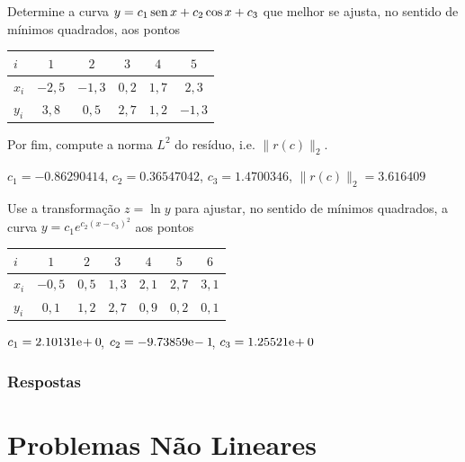 \begin{exer}
  Determine a curva $y = c_1\operatorname{sen} x + c_2\cos x + c_3$ que melhor se ajusta, no sentido de mínimos quadrados, aos pontos
  \begin{center}
    \begin{tabular}{l|ccccc}
      $i$ & $1$ & $2$ & $3$ & $4$ & $5$ \\\hline
      $x_i$ & $-2,5$ & $-1,3$ & $0,2$ & $1,7$ & $2,3$\\
      $y_i$ & $3,8$ & $0,5$ & $2,7$ & $1,2$ & $-1,3$\\\hline
    \end{tabular}
  \end{center}
Por fim, compute a norma $L^2$ do resíduo, i.e. $\|r(c)\|_2$.
\end{exer}
\begin{resp}
  $c_1 = -0.86290414$, $c_2 = 0.36547042$, $c_3 = 1.4700346$, $\|r(c)\|_2 = 3.616409$
\end{resp}

\begin{exer}
  Use a transformação $z = \ln y$ para ajustar, no sentido de mínimos quadrados, a curva $y = c_1e^{c_2(x-c_3)^2}$ aos pontos
  \begin{center}
    \begin{tabular}{l|cccccc}
      $i$ & $1$ & $2$ & $3$ & $4$ & $5$ & $6$ \\\hline
      $x_i$ & $-0,5$ & $0,5$ & $1,3$ & $2,1$ & $2,7$ & $3,1$ \\
      $y_i$ & $0,1$ & $1,2$ & $2,7$ & $0,9$ & $0,2$ & $0,1$ \\\hline
    \end{tabular}
  \end{center}
\end{exer}
\begin{resp}
  $c_1 = 2.10131\mathrm{e}\!+0\!$, $c_2 = -9.73859\mathrm{e}\!-1\!$, $c_3 = 1.25521\mathrm{e}\!+0\!$
\end{resp}

\ifisbook
\subsubsection{Respostas}
\shipoutAnswer
\fi

   
\section{Problemas Não Lineares}\label{cap_ajuste_sec_prob_nlin}
\badgeRevisar

